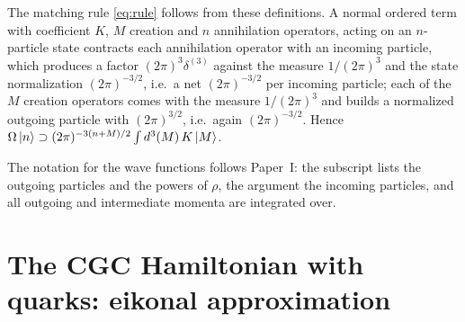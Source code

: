 The matching rule \eqref{eq:rule} follows from these definitions. A normal ordered term with
coefficient $K$, $M$ creation and $n$ annihilation operators, acting on an $n$-particle state
contracts each annihilation operator with an incoming particle, which produces a factor
$(2\pi)^{3}\delta^{(3)}$ against the measure $1/(2\pi)^{3}$ and the state normalization
$(2\pi)^{-3/2}$, i.e.\ a net $(2\pi)^{-3/2}$ per incoming particle; each of the $M$ creation operators
comes with the measure $1/(2\pi)^{3}$ and builds a normalized outgoing particle with
$(2\pi)^{3/2}$, i.e.\ again $(2\pi)^{-3/2}$. Hence $\Omega\left|n\right\rangle\supset(2\pi)^{-3(n+M)/2}\int d^{3}(M)\,K\left|M\right\rangle$.

The notation for the wave functions follows Paper~I: the subscript lists the outgoing particles and
the powers of $\rho$, the argument the incoming particles, and all outgoing and intermediate momenta
are integrated over.

\section{The CGC Hamiltonian with quarks: eikonal approximation}
\label{app:eikonal}

